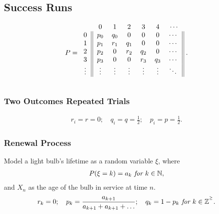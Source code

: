 \documentclass{article}
\begin{document}
\subsection{Success Runs}
\begin{align*}
    P = 
        \begin{blockarray}{ccccccc}
            & 0 & 1 & 2 & 3 & 4 & \cdots \\
            \begin{block}{c||cccccc||}
                0 & p_0 & q_0 & 0 & 0 & 0 & \cdots \\
                1 & p_1 & r_1 & q_1 & 0 & 0 & \cdots \\
                2 & p_2 & 0 & r_2 & q_2 & 0 & \cdots \\
                3 & p_3 & 0 & 0 & r_3 & q_3 & \cdots \\
                \vdots & \vdots & \vdots & \vdots & \vdots & \vdots & \ddots \\
            \end{block} 
        \end{blockarray}\; .
\end{align*}

\subsubsection{Two Outcomes Repeated Trials}
\begin{align*}
    r_i = r = 0; \quad q_i = q = \frac{1}{2}; \quad p_i = p = \frac{1}{2}.
\end{align*}

\subsubsection{Renewal Process} 
Model a light bulb's lifetime as a random variable $\xi$, where
\begin{align*}
    P(\xi=k) = a_k \emph{ for } k \in\mathbb{N},
\end{align*}
and $X_n$ as the age of the bulb in service at time $n$.
\begin{align*}
    r_k = 0; \quad p_k = \frac{a_{k+1}}{a_{k+1} + a_{k+1} + \dots}; \quad q_k = 1-p_k \emph{ for } k \in\mathbb{Z^{^\ge}}.
\end{align*}
\end{document}
